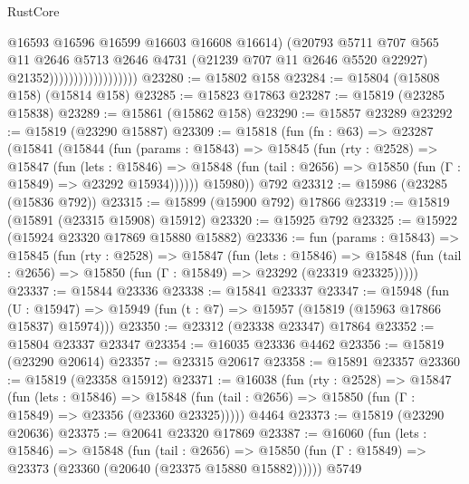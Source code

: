 \begin{lexlean}{RustCore}
\begin{coremodule}
                                        @16593
                                        @16596
                                        @16599
                                        @16603
                                        @16608
                                        @16614)
                                      (@20793
                                        @5711
                                        @707
                                        @565
                                        @11
                                        @2646
                                        @5713
                                        @2646
                                        @4731
                                        (@21239 @707 @11 @2646 @5520 @22927)
                                        @21352))))))))))))))))))
@23280 := @15802 @158
@23284 := @15804 (@15808 @158) (@15814 @158)
@23285 := @15823 @17863
@23287 := @15819 (@23285 @15838)
@23289 := @15861 (@15862 @158)
@23290 := @15857 @23289
@23292 := @15819 (@23290 @15887)
@23309 := @15818
    (fun (fn : @63) =>
    @23287
      (@15841
        (@15844
          (fun (params : @15843) =>
          @15845
            (fun (rty : @2528) =>
            @15847
              (fun (lets : @15846) =>
              @15848 (fun (tail : @2656) => @15850 (fun (Γ : @15849) => @23292 @15934))))))
        @15980))
    @792
@23312 := @15986 (@23285 (@15836 @792))
@23315 := @15899 (@15900 @792) @17866
@23319 := @15819 (@15891 (@23315 @15908) @15912)
@23320 := @15925 @792
@23325 := @15922 (@15924 @23320 @17869 @15880 @15882)
@23336 := fun (params : @15843) =>
  @15845
    (fun (rty : @2528) =>
    @15847
      (fun (lets : @15846) =>
      @15848 (fun (tail : @2656) => @15850 (fun (Γ : @15849) => @23292 (@23319 @23325)))))
@23337 := @15844 @23336
@23338 := @15841 @23337
@23347 := @15948
    (fun (U : @15947) => @15949 (fun (t : @7) => @15957 (@15819 (@15963 @17866 @15837) @15974)))
@23350 := @23312 (@23338 @23347) @17864
@23352 := @15804 @23337 @23347
@23354 := @16035 @23336 @4462
@23356 := @15819 (@23290 @20614)
@23357 := @23315 @20617
@23358 := @15891 @23357
@23360 := @15819 (@23358 @15912)
@23371 := @16038
    (fun (rty : @2528) =>
    @15847
      (fun (lets : @15846) =>
      @15848 (fun (tail : @2656) => @15850 (fun (Γ : @15849) => @23356 (@23360 @23325)))))
    @4464
@23373 := @15819 (@23290 @20636)
@23375 := @20641 @23320 @17869
@23387 := @16060
    (fun (lets : @15846) =>
    @15848
      (fun (tail : @2656) =>
      @15850 (fun (Γ : @15849) => @23373 (@23360 (@20640 (@23375 @15880 @15882))))))
    @5749

\end{coremodule}
\end{lexlean}
